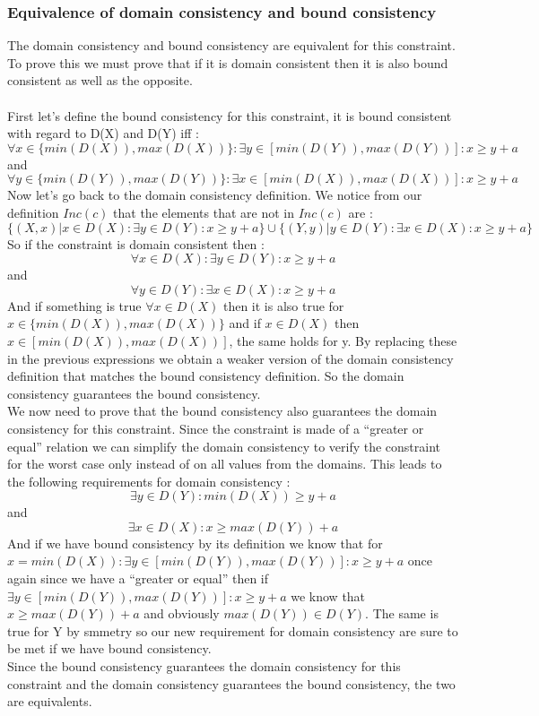 \documentclass{eplDoc}
\begin{document}
\subsubsection{Equivalence of domain consistency and bound consistency}
The domain consistency and bound consistency are equivalent for this constraint. To prove this we must prove that if it is domain consistent then it is also bound consistent as well as the opposite. \\ \\ 
First let's define the bound consistency for this constraint, it is bound consistent with regard to D(X) and D(Y) iff :
$$\forall x \in \{ min(D(X)), max(D(X))\} : \exists y \in [min(D(Y)), max(D(Y))] : x \geq y+a$$ and
$$\forall y \in \{ min(D(Y)), max(D(Y))\} : \exists x \in [min(D(X)), max(D(X))] : x \geq y+a$$
Now let's go back to the domain consistency definition. We notice from our definition $Inc(c)$ that the elements that are not in $Inc(c)$ are : 
$$\{(X, x)|x \in D(X) : \exists y \in D(Y) : x \geq y+a\} \cup \{(Y, y)|y \in D(Y) : \exists x \in D(X) : x \geq y+a\}$$
So if the constraint is domain consistent then :
$$\forall x \in D(X) : \exists y \in D(Y) : x \geq y+a$$ and
$$\forall y \in D(Y) : \exists x \in D(X) : x \geq y+a$$
And if something is true $\forall x\in D(X)$ then it is also true for $x \in \{ min(D(X)), max(D(X))\}$ and if $x \in D(X)$ then $x \in [min(D(X)), max(D(X))]$, the same holds for y. By replacing these in the previous expressions we obtain a weaker version of the domain consistency definition that matches the bound consistency definition. So the domain consistency guarantees the bound consistency. \\ 
We now need to prove that the bound consistency also guarantees the domain consistency for this constraint. Since the constraint is made of a "`greater or equal"' relation we can simplify the domain consistency to verify the constraint for the worst case only instead of on all values from the domains. This leads to the following requirements for domain consistency : 
$$ \exists y \in D(Y) : min(D(X)) \geq y+a$$ and
$$ \exists x \in D(X) : x \geq max(D(Y))+a$$
And if we have bound consistency by its definition we know that for $x=min(D(X)) : \exists y \in [min(D(Y)), max(D(Y))] : x \geq y+a$ once again since we have a "`greater or equal"' then if $\exists y \in [min(D(Y)), max(D(Y))]: x \geq y+a$ we know that $x \geq max(D(Y))+a$ and obviously $max(D(Y))\in D(Y)$. The same is true for Y by smmetry so our new requirement for domain consistency are sure to be met if we have bound consistency. \\ 
Since the bound consistency guarantees the domain consistency for this constraint and the domain consistency guarantees the bound consistency, the two are equivalents.  
\end{document}
